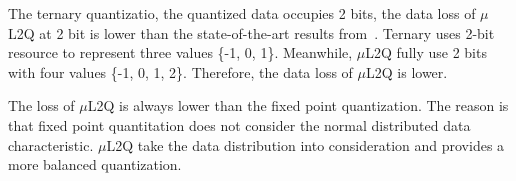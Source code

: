 The ternary quantizatio, the quantized data occupies 2 bits, the data loss of $\mu$L2Q at 2 bit is lower than the state-of-the-art results from~\cite{TWNs}. 
Ternary uses 2-bit resource to represent three values \{-1, 0, 1\}. Meanwhile, $\mu$L2Q fully use 2 bits with four values \{-1, 0, 1, 2\}. Therefore, the data loss of $\mu$L2Q is lower.

The loss of $\mu$L2Q is always lower than the fixed point quantization. The reason is that fixed point quantitation does not consider the normal distributed data characteristic. $\mu$L2Q take the data distribution into consideration and provides a more balanced quantization. 


